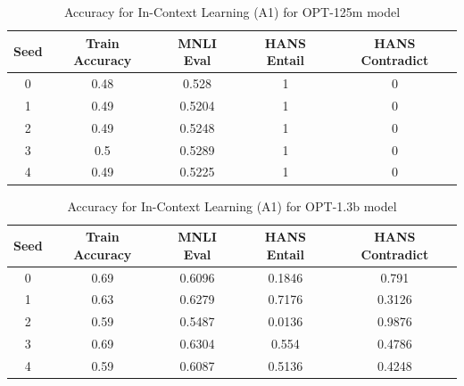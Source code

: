 \documentclass[10pt,twocolumn,letterpaper]{article}
\begin{document}
\begin{table}[h!]
\begin{center}
\begin{tabular}{|c|c|c|c|c|}
\hline
\textbf{Seed} & \textbf{Train Accuracy} & \textbf{MNLI Eval} & \textbf{HANS Entail} & \textbf{HANS Contradict} \\
\hline
\hline
0 & 0.48 & 0.528 & 1 & 0 \\
1 & 0.49 & 0.5204 & 1 & 0 \\
2 & 0.49 & 0.5248 & 1 & 0 \\
3 & 0.5 & 0.5289 & 1 & 0 \\
4 & 0.49 & 0.5225 & 1 & 0 \\
\hline
\end{tabular}
\end{center}
\caption{Accuracy for In-Context Learning (A1) for OPT-125m model}
\end{table}


\begin{table}[h!]
\begin{center}
\begin{tabular}{|c|c|c|c|c|}
\hline
\textbf{Seed} & \textbf{Train Accuracy} & \textbf{MNLI Eval} & \textbf{HANS Entail} & \textbf{HANS Contradict} \\
\hline
\hline
0 & 0.69 & 0.6096 & 0.1846 & 0.791 \\
1 & 0.63 & 0.6279 & 0.7176 & 0.3126 \\
2 & 0.59 & 0.5487 & 0.0136 & 0.9876 \\
3 & 0.69 & 0.6304 & 0.554 & 0.4786 \\
4 & 0.59 & 0.6087 & 0.5136 & 0.4248 \\
\hline
\end{tabular}
\end{center}
\caption{Accuracy for In-Context Learning (A1) for OPT-1.3b model}
\end{table}

	
\end{document}
